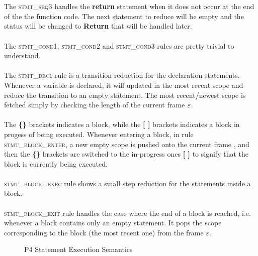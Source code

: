 \documentclass[UTF8]{article}
\begin{document}
\\~\\
The \textsc{stmt\_seq3} handles the \textbf{return} statement when it does not occur at the end of the the function code. The next statement to reduce will be empty and the status will be changed to \textbf{Return} that will be handled later.
\\~\\
The \textsc{stmt\_cond1}, \textsc{stmt\_cond2} and \textsc{stmt\_cond3} rules are pretty trivial to understand.
\\~\\
The \textsc{stmt\_decl} rule is a transition reduction for the declaration statements. Whenever a variable is declared, it will updated in the most recent scope and reduce the transition to an empty statement. The most recent/newest scope is fetched simply by checking the length of the current frame $\varepsilon$. 
\\~\\
The \textbf{\{\}} brackets indicates a block, while the \textbf{[ ]} brackets indicates a block in progess of being executed.
Whenever entering a block, in rule \textsc{stmt\_block\_enter}, a new empty scope \escope{} is pushed onto the current frame \currsf{}, and then the \textbf{\{\}} brackets are switched to the in-progress ones \textbf{[ ]} to signify that the block is currently being executed.
\\~\\
\textsc{stmt\_block\_exec} rule shows a small step reduction for the statements inside a block.
\\~\\
\textsc{stmt\_block\_exit} rule handles the case where the end of a block is reached, i.e. whenever a block contains only an empty statement. It pops the scope corresponding to the block (the most recent one) from the frame $\varepsilon$.


\begin{figure}[ht!]
\ottdefnsstmtXXsem
\caption{P4 Statement Execution Semantics}
\label{fig:semstmtexec}
\end{figure}

\newcommand{\start}{\textit{start}}
\end{document}
